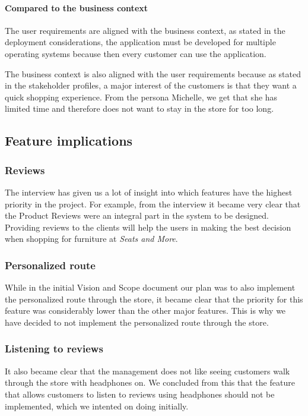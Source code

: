 \documentclass[a4paper]{article}
\begin{document}
\paragraph{Compared to the business context}
The user requirements are aligned with the business context, as stated in the deployment considerations, the application must be developed for multiple operating systems because then every customer can use the application.

The business context is also aligned with the user requirements because as stated in the stakeholder profiles, a major interest of the customers is that they want a quick shopping experience. From the persona Michelle, we get that she has limited time and therefore does not want to stay in the store for too long.

\subsection{Feature implications}
\subsubsection*{Reviews}
The interview has given us a lot of insight into which features have the highest priority in the project. For example, from the interview it became very clear that the Product Reviews were an integral part in the system to be designed. Providing reviews to the clients will help the users in making the best decision when shopping for furniture at \textit{Seats and More}.

\subsubsection*{Personalized route}
While in the initial Vision and Scope document our plan was to also implement the personalized route through the store, it  became clear that the priority for this feature was considerably lower than the other major features. This is why we have decided to not implement the personalized route through the store. 

\subsubsection*{Listening to reviews}
It also became clear that the management does not like seeing customers walk through the store with headphones on. We concluded from this that the feature that allows customers to listen to reviews using headphones should not be implemented, which we intented on doing initially. 
\end{document}
